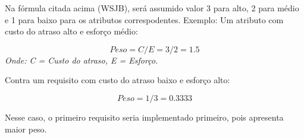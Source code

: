 Na fórmula citada acima (WSJB), será assumido valor 3 para alto, 2 para médio e 1 para baixo para os atributos correspodentes. Exemplo: Um atributo com custo do atraso alto e esforço médio:

\begin{equation}
  Peso = C / E = 3/2 = 1.5
\end{equation}
  \emph{Onde: C = Custo do atraso, E = Esforço.}

Contra um requisito com custo do atraso baixo e esforço alto:

\begin{equation}
  Peso = 1/3 = 0.3333
\end{equation}

Nesse caso, o primeiro requisito seria implementado primeiro, pois apresenta maior peso.
